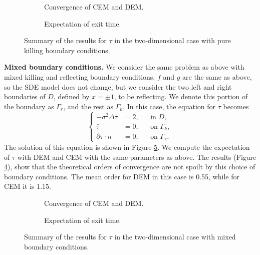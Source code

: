 \begin{figure}[t]
    \centering
    \begin{subfigure}{0.49\linewidth}
        \centering
        \resizebox{1\linewidth}{!}{ }  
        \caption{Convergence of CEM and DEM.}
        \label{fig:KillTwoD}
    \end{subfigure}
    \begin{subfigure}{0.49\linewidth}
        \centering
        \resizebox{1\linewidth}{!}{ }  
        \caption{Expectation of exit time.}
        \label{fig:TauExact2DKill}
    \end{subfigure}    
    \caption{Summary of the results for $\tau$ in the two-dimensional case with pure killing boundary conditions.}
    \label{fig:OrdersTwoDKill}
\end{figure}
\vspace{2mm}
\noindent\textbf{Mixed boundary conditions.} We consider the same problem as above with mixed killing and reflecting boundary conditions. $f$ and $g$ are the same as above, so the SDE model does not change, but we consider the two left and right boundaries of $D$, defined by $x = \pm 1$, to be reflecting. We denote this portion of the boundary as $\Gamma_r$, and the rest as $\Gamma_k$. In this case, the equation for $\bar\tau$ becomes
\begin{equation}\label{eq:PDETau2DKilling}
	\left \{
  	\begin{aligned}
	- \sigma^2 \Delta \bar \tau &= 2, && \text{in } D, \\
	\bar \tau &= 0, && \text{on } \Gamma_k, \\
	\partial \bar \tau \cdot n &= 0, && \text{on } \Gamma_r.
	\end{aligned} \right.
\end{equation}
The solution of this equation is shown in Figure \ref{fig:TauExact2DRefl}. We compute the expectation of $\tau$ with DEM and CEM with the same parameters as above. The results (Figure \ref{fig:ReflTwoD}), show that the theoretical orders of convergence are not spoilt by this choice of boundary conditions. The mean order for DEM in this case is 0.55, while for CEM it is 1.15.


\begin{figure}[t]
    \centering
    \begin{subfigure}{0.49\linewidth}
        \centering
        \resizebox{1\linewidth}{!}{ }  
        \caption{Convergence of CEM and DEM.}
        \label{fig:ReflTwoD}
    \end{subfigure}
    \begin{subfigure}{0.49\linewidth}
        \centering
        \resizebox{1\linewidth}{!}{ }  
        \caption{Expectation of exit time.}
        \label{fig:TauExact2DRefl}
    \end{subfigure}    
    \caption{Summary of the results for $\tau$ in the two-dimensional case with mixed boundary conditions.}
    \label{fig:OrdersTwoDRefl}
\end{figure}
